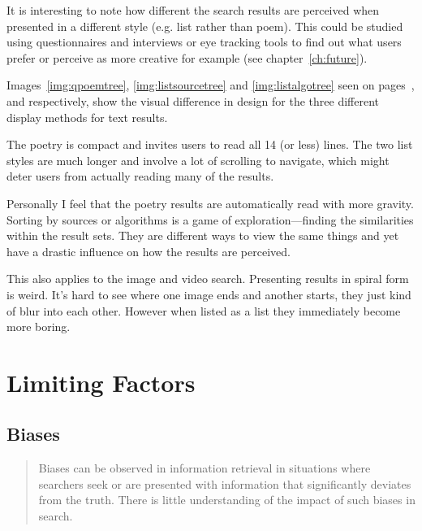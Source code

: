 It is interesting to note how different the search results are perceived when presented in a different style (e.g. list rather than poem). This could be studied using questionnaires and interviews or eye tracking tools to find out what users prefer or perceive as more creative for example (see chapter~\ref{ch:future}). 

Images~\ref{img:qpoemtree}, \ref{img:listsourcetree} and \ref{img:listalgotree} seen on pages~\pageref{img:qpoemtree},\pageref{img:listsourcetree} and \pageref{img:qpoemtree} respectively, show the visual difference in design for the three different display methods for text results.

The poetry is compact and invites users to read all 14 (or less) lines. The two list styles are much longer and involve a lot of scrolling to navigate, which might deter users from actually reading many of the results.

Personally I feel that the poetry results are automatically read with more gravity. Sorting by sources or algorithms is a game of exploration---finding the similarities within the result sets. They are different ways to view the same things and yet have a drastic influence on how the results are perceived. 

This also applies to the image and video search. Presenting results in spiral form is weird. It's hard to see where one image ends and another starts, they just kind of blur into each other. However when listed as a list they immediately become more boring.


\section{Limiting Factors}

\subsection{Biases}

\begin{quotation}
  Biases can be observed in information retrieval in situations where searchers seek or are presented with information that significantly deviates from the truth. There is little understanding of the impact of such biases in search. 
\end{quotation}

